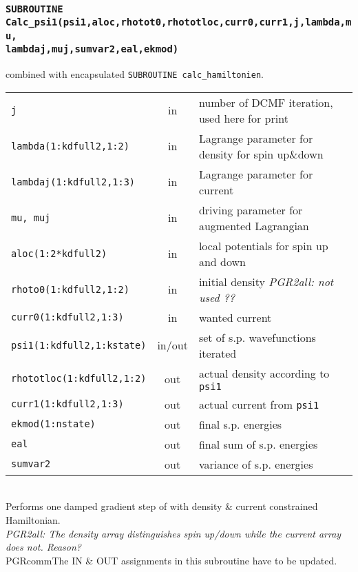 \documentclass[final,1p]{elsarticle}
\newcommand{\PGRcomm}[1]{{\color{blue}\small\em PGR2all: #1}}
\begin{document}
\subsubsection*{\tt SUBROUTINE
  Calc\_psi1(psi1,aloc,rhotot0,rhototloc,curr0,curr1,j,lambda,mu,
\\
lambdaj,muj,sumvar2,eal,ekmod)}
\noindent
combined with encapsulated {\tt SUBROUTINE calc\_hamiltonien}.
\\
\begin{tabular}{lcl}
 {\tt j} & in & number of DCMF iteration, used here for print\\
 {\tt lambda(1:kdfull2,1:2)} & in & Lagrange parameter for density for
 spin up\&down\\
 {\tt lambdaj(1:kdfull2,1:3)} & in & Lagrange parameter for current\\
 {\tt mu, muj} & in & driving parameter for augmented Lagrangian\\
 {\tt aloc(1:2*kdfull2)} & in & local potentials for spin up and down\\
 {\tt rhoto0(1:kdfull2,1:2)} & in & initial density \PGRcomm{not used ??}\\
 {\tt curr0(1:kdfull2,1:3)} & in & wanted current \\
 {\tt psi1(1:kdfull2,1:kstate)} & in/out & set of s.p. wavefunctions iterated\\
 {\tt rhototloc(1:kdfull2,1:2)} & out & actual density according to {\tt psi1}\\
 {\tt curr1(1:kdfull2,1:3)} & out & actual current from {\tt psi1}\\
 {\tt ekmod(1:nstate)} & out & final s.p. energies\\
 {\tt eal} & out & final sum of s.p. energies\\
 {\tt sumvar2} & out & variance of s.p. energies\\
\end{tabular}
\\[4pt]
Performs one damped gradient step of with density \& current
constrained Hamiltonian.
\\
\PGRcomm{The density array distinguishes spin up/down while the
  current array does not. Reason?}
\\
PGRcomm{The IN \& OUT assignments in this subroutine have to be updated.}
\end{document}
